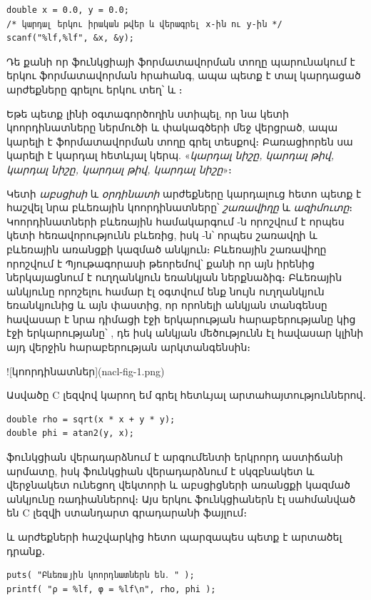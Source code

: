 \begin{Verbatim}
double x = 0.0, y = 0.0;
/* կարդալ երկու իրական թվեր և վերագրել x-ին ու y-ին */
scanf("%lf,%lf", &x, &y);
\end{Verbatim}

Դե քանի որ  ֆունկցիայի ֆորմատավորման տողը պարունակում է
երկու ֆորմատավորման հրահանգ, ապա պետք է տալ կարդացած արժեքները գրելու
երկու տեղ՝  և ։

Եթե պետք լինի օգտագործողին ստիպել, որ նա կետի կոորդինատները ներմուծի
\code{(} և \code{)} փակագծերի մեջ վերցրած, ապա կարելի է
ֆորմատավորման տողը գրել  տեսքով։ Բառացիորեն սա
կարելի է կարդալ հետևյալ կերպ. «\emph{կարդալ \code{(} նիշը, կարդալ
 թիվ, կարդալ \code{,} նիշը, կարդալ  թիվ,
կարդալ \code{)} նիշը}»։

Կետի  \emph{աբսցիսի} և  \emph{օրդինատի} արժեքները
կարդալուց հետո պետք է հաշվել նրա բևեռային կոորդինատները՝ 
\emph{շառավիղը} և  \emph{ազիմուտը}։ Կոորդինատների բևեռային
համակարգում -ն որոշվում է որպես կետի հեռավորությունն բևեռից,
իսկ -ն՝ որպես շառավղի և բևեռային առանցքի կազմած անկյուն։
Բևեռային շառավիղը որոշվում է Պյութագորասի թեորեմով՝ քանի որ այն իրենից
ներկայացնում է ուղղանկյուն եռանկյան ներքնաձիգ։ Բևեռային անկյունը
որոշելու համար էլ օգտվում ենք նույն ուղղանկյուն եռանկյունից և այն
փաստից, որ որոնելի անկյան տանգենսը հավասար է նրա դիմացի էջի երկարության
հարաբերությանը կից էջի երկարությանը՝ , դե իսկ անկյան
մեծությունն էլ հավասար կլինի այդ վերջին հարաբերության արկտանգենսին։

![կոորդինատներ](nacl-fig-1.png)

Ասվածը C լեզվով կարող եմ գրել հետևյալ արտահայտություններով․

\begin{verbatim}
double rho = sqrt(x * x + y * y);
double phi = atan2(y, x);
\end{verbatim}

 ֆունկցիան վերադարձնում է արգումենտի երկրորդ աստիճանի
արմատը, իսկ  ֆունկցիան վերադարձնում է  սկզբնակետ
և  վերջնակետ ունեցող վեկտորի և աբսցիցների առանցքի կազմած
անկյունը ռադիաններով։ Այս երկու ֆունկցիաներն էլ սահմանված են C լեզվի
ստանդարտ գրադարանի  ֆայլում։

 և  արժեքների հաշվարկից հետո պարզապես պետք է
արտածել դրանք․

\begin{verbatim}
puts( "Բևեռային կոորդնատներն են․ " );
printf( "ρ = %lf, φ = %lf\n", rho, phi );
\end{verbatim}

